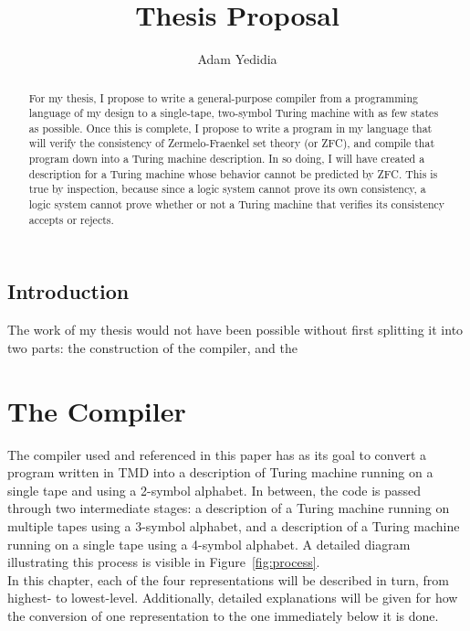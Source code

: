 \documentclass{report}
\begin{document}
\title{Thesis Proposal}
\author{Adam Yedidia}

\maketitle

\begin{abstract}

For my thesis, I propose to write a general-purpose compiler from a programming language of my design to a single-tape, two-symbol Turing machine with as few states as possible. Once this is complete, I propose to write a program in my language that will verify the consistency of Zermelo-Fraenkel set theory (or ZFC), and compile that program down into a Turing machine description. In so doing, I will have created a description for a Turing machine whose behavior cannot be predicted by ZFC. This is true by inspection, because since a logic system cannot prove its own consistency, a logic system cannot prove whether or not a Turing machine that verifies its consistency accepts or rejects.
\end{abstract}

\section{Introduction}
The work of my thesis would not have been possible without first splitting it into two parts: the construction of the compiler, and the 


\chapter{The Compiler}

The compiler used and referenced in this paper has as its goal to convert a program written in TMD into a description of Turing machine running on a single tape and using a 2-symbol alphabet. In between, the code is passed through two intermediate stages: a description of a Turing machine running on multiple tapes using a 3-symbol alphabet, and a description of a Turing machine running on a single tape using a 4-symbol alphabet. A detailed diagram illustrating this process is visible in Figure~\ref{fig:process}. \\

In this chapter, each of the four representations will be described in turn, from highest- to lowest-level. Additionally, detailed explanations will be given for how the conversion of one representation to the one immediately below it is done.
\end{document}
